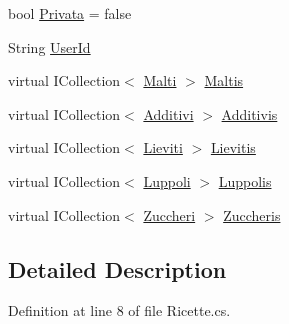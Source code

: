 \begin{DoxyCompactItemize}
\item 
bool \mbox{\hyperlink{class_brew_day2_1_1_models_1_1_ricette_a50dd5fcfb1db513931cf67807a747910}{Privata}} = false
\item 
String \mbox{\hyperlink{class_brew_day2_1_1_models_1_1_ricette_a21f36d0a99e22d9ae57d5588e194775b}{User\+Id}}
\item 
virtual I\+Collection$<$ \mbox{\hyperlink{class_brew_day2_1_1_models_1_1_malti}{Malti}} $>$ \mbox{\hyperlink{class_brew_day2_1_1_models_1_1_ricette_a0df3542f1e9c4424c898a465da415e62}{Maltis}}
\item 
virtual I\+Collection$<$ \mbox{\hyperlink{class_brew_day2_1_1_models_1_1_additivi}{Additivi}} $>$ \mbox{\hyperlink{class_brew_day2_1_1_models_1_1_ricette_ab9dff35d4459c88be560b28a8777b519}{Additivis}}
\item 
virtual I\+Collection$<$ \mbox{\hyperlink{class_brew_day2_1_1_models_1_1_lieviti}{Lieviti}} $>$ \mbox{\hyperlink{class_brew_day2_1_1_models_1_1_ricette_ac1ad873ff580cd3701f304d44113586c}{Lievitis}}
\item 
virtual I\+Collection$<$ \mbox{\hyperlink{class_brew_day2_1_1_models_1_1_luppoli}{Luppoli}} $>$ \mbox{\hyperlink{class_brew_day2_1_1_models_1_1_ricette_a62ad1d9a4612a87d1f42e5bf262db9e7}{Luppolis}}
\item 
virtual I\+Collection$<$ \mbox{\hyperlink{class_brew_day2_1_1_models_1_1_zuccheri}{Zuccheri}} $>$ \mbox{\hyperlink{class_brew_day2_1_1_models_1_1_ricette_a2f9935b9c19790de2e0a52bc7d3e6a5f}{Zuccheris}}
\end{DoxyCompactItemize}


\subsection{Detailed Description}


Definition at line 8 of file Ricette.\+cs.



